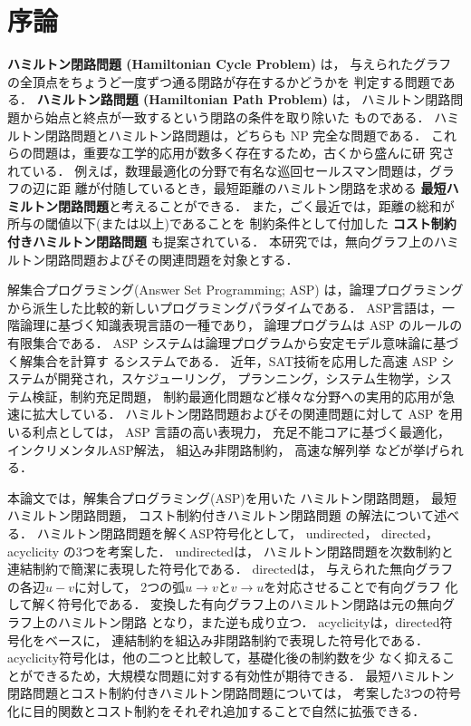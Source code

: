 \chapter{序論}

\textbf{ハミルトン閉路問題 (Hamiltonian Cycle Problem)} は，
与えられたグラフの全頂点をちょうど一度ずつ通る閉路が存在するかどうかを
判定する問題である\cite{hirata15:book}．
\textbf{ハミルトン路問題 (Hamiltonian Path Problem)} は，
ハミルトン閉路問題から始点と終点が一致するという閉路の条件を取り除いた
ものである．
ハミルトン閉路問題とハミルトン路問題は，どちらも NP 完全な問題である．
これらの問題は，重要な工学的応用が数多く存在するため，古くから盛んに研
究されている．
例えば，数理最適化の分野で有名な巡回セールスマン問題は，グラフの辺に距
離が付随しているとき，最短距離のハミルトン閉路を求める
\textbf{最短ハミルトン閉路問題}と考えることができる．
また，ごく最近では，距離の総和が所与の閾値以下(または以上)であることを
制約条件として付加した
\textbf{コスト制約付きハミルトン閉路問題}
も提案されている\cite{comp20:Minato}．
本研究では，無向グラフ上のハミルトン閉路問題およびその関連問題を対象とする．

解集合プログラミング(Answer Set Programming; ASP\cite{%
  Baral03:cambridge,%
  Gelfond88:iclp,%
  Inoue08:jssst,%
  Niemela99:amai})
は，論理プログラミングから派生した比較的新しいプログラミングパラダイムである．
ASP言語は，一階論理に基づく知識表現言語の一種であり，
論理プログラムは ASP のルールの有限集合である．
ASP システムは論理プログラムから安定モデル意味論に基づく解集合を計算す
るシステムである．
近年，SAT技術を応用した高速 ASP システムが開発され，スケジューリング，
プランニング，システム生物学，システム検証，制約充足問題，
制約最適化問題など様々な分野への実用的応用が急速に拡大している．
ハミルトン閉路問題およびその関連問題に対して ASP を用いる利点としては，
ASP 言語の高い表現力，
充足不能コアに基づく最適化，
インクリメンタルASP解法，
組込み非閉路制約，
高速な解列挙
などが挙げられる．

本論文では，解集合プログラミング(ASP)を用いた
ハミルトン閉路問題，
最短ハミルトン閉路問題，
コスト制約付きハミルトン閉路問題
の解法について述べる．
%
ハミルトン閉路問題を解くASP符号化として，
\textsf{undirected}，
\textsf{directed}，
\textsf{acyclicity}
の3つを考案した．
\textsf{undirected}は，
ハミルトン閉路問題を次数制約と連結制約で簡潔に表現した符号化である．
\textsf{directed}は，
与えられた無向グラフの各辺$u-v$に対して，
2つの弧$u\rightarrow v$と$v\rightarrow u$を対応させることで有向グラフ
化して解く符号化である．
変換した有向グラフ上のハミルトン閉路は元の無向グラフ上のハミルトン閉路
となり，また逆も成り立つ．
\textsf{acyclicity}は，\textsf{directed}符号化をベースに，
連結制約を組込み非閉路制約で表現した符号化である．
\textsf{acyclicity}符号化は，他の二つと比較して，基礎化後の制約数を少
なく抑えることができるため，大規模な問題に対する有効性が期待できる．
最短ハミルトン閉路問題とコスト制約付きハミルトン閉路問題については，
考案した3つの符号化に目的関数とコスト制約をそれぞれ追加することで自然に拡張できる．

